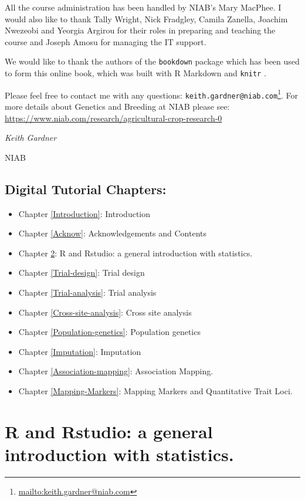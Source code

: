 \documentclass[
]{book}
\renewcommand{\href}[2]{#2\footnote{\url{#1}}}
\begin{document}
All the course administration has been handled by NIAB's Mary MacPhee. I would also like to thank Tally Wright, Nick Fradgley, Camila Zanella, Joachim Nwezeobi and Yeorgia Argirou for their roles in preparing and teaching the course and Joseph Amosu for managing the IT support.

We would like to thank the authors of the \texttt{bookdown} package \citep{R-bookdown} which has been used to form this online book, which was built with R Markdown and \texttt{knitr} \citep{xie2015}.

Please feel free to contact me with any questions: \href{mailto:keith.gardner@niab.com}{\nolinkurl{keith.gardner@niab.com}}. For more details about Genetics and Breeding at NIAB please see: \url{https://www.niab.com/research/agricultural-crop-research-0}

\emph{Keith Gardner}

NIAB

\hypertarget{digital-tutorial-chapters}{%
\section{Digital Tutorial Chapters:}\label{digital-tutorial-chapters}}

\begin{itemize}
\item
  Chapter \ref{Introduction}: Introduction
\item
  Chapter \ref{Acknow}: Acknowledgements and Contents
\item
  Chapter \ref{R-and-stats}: R and Rstudio: a general introduction with statistics.
\item
  Chapter \ref{Trial-design}: Trial design
\item
  Chapter \ref{Trial-analysis}: Trial analysis
\item
  Chapter \ref{Cross-site-analysis}: Cross site analysis
\item
  Chapter \ref{Population-genetics}: Population genetics
\item
  Chapter \ref{Imputation}: Imputation
\item
  Chapter \ref{Association-mapping}: Association Mapping.
\item
  Chapter \ref{Mapping-Markers}: Mapping Markers and Quantitative Trait Loci.
\end{itemize}

\hypertarget{R-and-stats}{%
\chapter{R and Rstudio: a general introduction with statistics.}\label{R-and-stats}}
\end{document}
